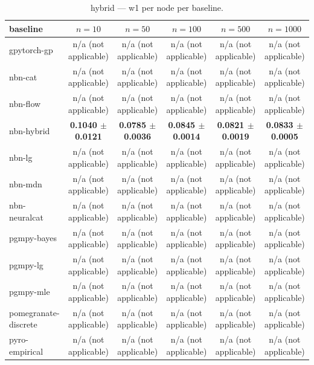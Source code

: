 \begin{table}[h]
\centering
\caption{hybrid — w1 per node per baseline.}
\label{tab:hybrid_w1_per_node}
\begin{tabular}{lccccc}
\toprule
baseline & $n=10$ & $n=50$ & $n=100$ & $n=500$ & $n=1000$ \\
\midrule
gpytorch-gp & n/a (not applicable) & n/a (not applicable) & n/a (not applicable) & n/a (not applicable) & n/a (not applicable) \\
nbn-cat & n/a (not applicable) & n/a (not applicable) & n/a (not applicable) & n/a (not applicable) & n/a (not applicable) \\
nbn-flow & n/a (not applicable) & n/a (not applicable) & n/a (not applicable) & n/a (not applicable) & n/a (not applicable) \\
nbn-hybrid & \textbf{0.1040 $\pm$ 0.0121} & \textbf{0.0785 $\pm$ 0.0036} & \textbf{0.0845 $\pm$ 0.0014} & \textbf{0.0821 $\pm$ 0.0019} & \textbf{0.0833 $\pm$ 0.0005} \\
nbn-lg & n/a (not applicable) & n/a (not applicable) & n/a (not applicable) & n/a (not applicable) & n/a (not applicable) \\
nbn-mdn & n/a (not applicable) & n/a (not applicable) & n/a (not applicable) & n/a (not applicable) & n/a (not applicable) \\
nbn-neuralcat & n/a (not applicable) & n/a (not applicable) & n/a (not applicable) & n/a (not applicable) & n/a (not applicable) \\
pgmpy-bayes & n/a (not applicable) & n/a (not applicable) & n/a (not applicable) & n/a (not applicable) & n/a (not applicable) \\
pgmpy-lg & n/a (not applicable) & n/a (not applicable) & n/a (not applicable) & n/a (not applicable) & n/a (not applicable) \\
pgmpy-mle & n/a (not applicable) & n/a (not applicable) & n/a (not applicable) & n/a (not applicable) & n/a (not applicable) \\
pomegranate-discrete & n/a (not applicable) & n/a (not applicable) & n/a (not applicable) & n/a (not applicable) & n/a (not applicable) \\
pyro-empirical & n/a (not applicable) & n/a (not applicable) & n/a (not applicable) & n/a (not applicable) & n/a (not applicable) \\
\bottomrule
\end{tabular}
\end{table}

